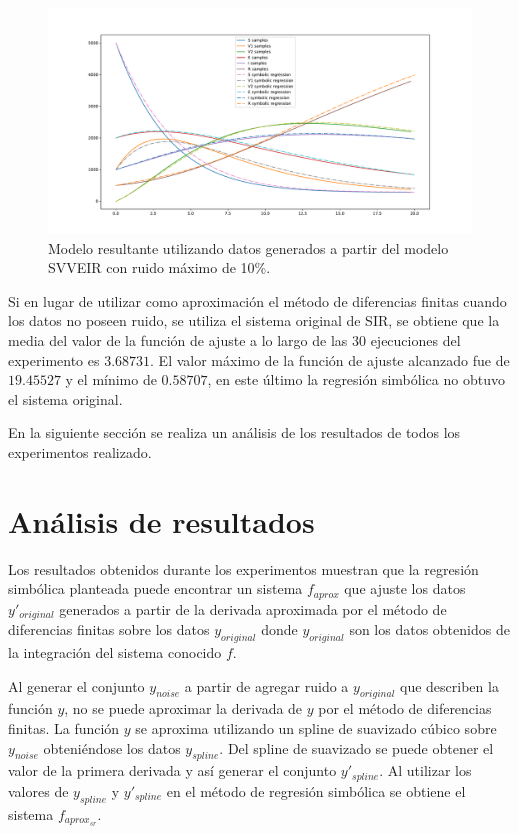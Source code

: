 \begin{figure}[h]
    \centering
    \includegraphics[width=\textwidth]{"figures/final_plot_SVVEIR_0.1.pdf"}
    \caption{Modelo resultante utilizando datos generados a partir del modelo SVVEIR con ruido máximo de 10\%.}
    \label{fig:final_plot_SVVEIR_0.1}
\end{figure}

Si en lugar de utilizar como aproximación el método de diferencias finitas cuando los datos no poseen ruido, se utiliza el sistema original de SIR, se obtiene que la media del valor de la función de ajuste a lo largo de las 30 ejecuciones del experimento es $3.68731$. El valor máximo de la función de ajuste alcanzado fue de $19.45527$ y el mínimo de $0.58707$, en este último la regresión simbólica no obtuvo el sistema original.

En la siguiente sección se realiza un análisis de los resultados de todos los experimentos realizado.

\section{Análisis de resultados}\label{section:experiments_results}

Los resultados obtenidos durante los experimentos muestran que la regresión simbólica planteada puede encontrar un sistema $f_{aprox}$ que ajuste los datos $y'_{original}$ generados a partir de la derivada aproximada por el método de diferencias finitas sobre los datos $y_{original}$ donde $y_{original}$ son los datos obtenidos de la integración del sistema conocido $f$.

Al generar el conjunto $y_{noise}$ a partir de agregar ruido a $y_{original}$ que describen la función $y$, no se puede aproximar la derivada de $y$ por el método de diferencias finitas. La función $y$ se aproxima utilizando un spline de suavizado cúbico sobre $y_{noise}$ obteniéndose los datos $y_{spline}$. Del spline de suavizado se puede obtener el valor de la primera derivada y así generar el conjunto $y'_{spline}$. Al utilizar los valores de $y_{spline}$ y $y'_{spline}$ en el método de regresión simbólica se obtiene el sistema $f_{aprox_{sr}}$.

